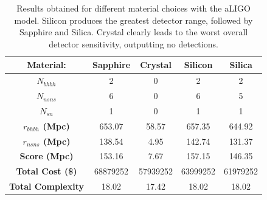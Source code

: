 \documentclass{article}
\begin{document}
    \begin{table}[h]
    	\centering
  \captionsetup{width=0.9\textwidth}
         \caption{Results obtained for different material choices with the aLIGO model. Silicon produces the greatest detector range, followed by Sapphire and Silica. Crystal clearly leads to the worst overall detector sensitivity, outputting no detections.}
    \begin{tabular}{ |c|c|c|c|c| } 
     \hline
     \textbf{Material:} & \textbf{Sapphire}  & \textbf{Crystal}  & \textbf{Silicon}  & \textbf{Silica} \\ 
     \hline
     \textbf{$N_{bhbh}$}  & 2 & 0 & 2 & 2\\ 
     \hline
     \textbf{$N_{nsns}$}  & 6 & 0 & 6 & 5\\ 
     \hline
     \textbf{$N_{sn}$}  & 1 & 0  & 1 & 1 \\ 
     \hline
     \textbf{$r_{bhbh}$ (Mpc)}  & 653.07 & 58.57  & 657.35  & 644.92 \\ 
     \hline
      \textbf{$r_{nsns}$ (Mpc)}  & 138.54  & 4.95  & 142.74 & 131.37 \\ 
      \hline
    \textbf{Score (Mpc)}  & 153.16  & 7.67  & 157.15  & 146.35 \\
    \hline
    \textbf{Total Cost (\$)}  & 68879252  & 57939252  & 63999252  & 61979252 \\ 
    \hline
      \textbf{Total Complexity}  & 18.02  & 17.42  & 18.02  & 18.02 \\ 
     \hline
    \end{tabular}
    \label{tab::materialstest}

    \end{table}
    
\end{document}
